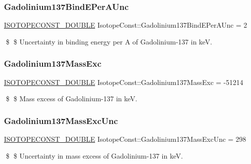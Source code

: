 \subsubsection{\texorpdfstring{Gadolinium137\+Bind\+E\+Per\+A\+Unc}{Gadolinium137BindEPerAUnc}}
{\footnotesize\ttfamily \mbox{\hyperlink{group___isotope_const-_macros_ga8f45a7272ce02c0b4c65c44636ed719a}{I\+S\+O\+T\+O\+P\+E\+C\+O\+N\+S\+T\+\_\+\+D\+O\+U\+B\+LE}} Isotope\+Const\+::\+Gadolinium137\+Bind\+E\+Per\+A\+Unc = 2}

\$ \$ Uncertainty in binding energy per A of Gadolinium-\/137 in keV. \mbox{\label{group___isotope_const-_gadolinium-_gd137_gab29cb9a0df77c6541f1ec3b893e21d16}} 
\subsubsection{\texorpdfstring{Gadolinium137\+Mass\+Exc}{Gadolinium137MassExc}}
{\footnotesize\ttfamily \mbox{\hyperlink{group___isotope_const-_macros_ga8f45a7272ce02c0b4c65c44636ed719a}{I\+S\+O\+T\+O\+P\+E\+C\+O\+N\+S\+T\+\_\+\+D\+O\+U\+B\+LE}} Isotope\+Const\+::\+Gadolinium137\+Mass\+Exc = -\/51214}

\$ \$ Mass excess of Gadolinium-\/137 in keV. \mbox{\label{group___isotope_const-_gadolinium-_gd137_gac47d8cd132a6d868df029034c7273d2d}} 
\subsubsection{\texorpdfstring{Gadolinium137\+Mass\+Exc\+Unc}{Gadolinium137MassExcUnc}}
{\footnotesize\ttfamily \mbox{\hyperlink{group___isotope_const-_macros_ga8f45a7272ce02c0b4c65c44636ed719a}{I\+S\+O\+T\+O\+P\+E\+C\+O\+N\+S\+T\+\_\+\+D\+O\+U\+B\+LE}} Isotope\+Const\+::\+Gadolinium137\+Mass\+Exc\+Unc = 298}

\$ \$ Uncertainty in mass excess of Gadolinium-\/137 in keV. \mbox{\label{group___isotope_const-_gadolinium-_gd137_ga6393d385583e694fe7568b77494a72d0}} 
